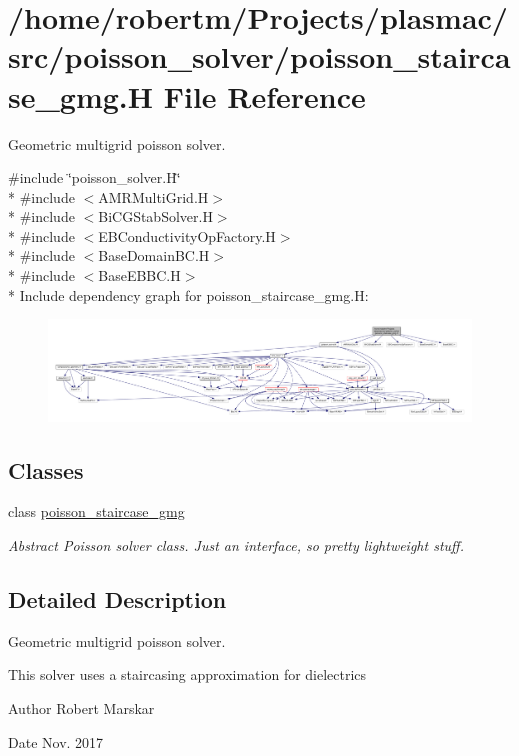 \hypertarget{poisson__staircase__gmg_8H}{}\section{/home/robertm/\+Projects/plasmac/src/poisson\+\_\+solver/poisson\+\_\+staircase\+\_\+gmg.H File Reference}
\label{poisson__staircase__gmg_8H}


Geometric multigrid poisson solver.  


{\ttfamily \#include \char`\"{}poisson\+\_\+solver.\+H\char`\"{}}\\*
{\ttfamily \#include $<$A\+M\+R\+Multi\+Grid.\+H$>$}\\*
{\ttfamily \#include $<$Bi\+C\+G\+Stab\+Solver.\+H$>$}\\*
{\ttfamily \#include $<$E\+B\+Conductivity\+Op\+Factory.\+H$>$}\\*
{\ttfamily \#include $<$Base\+Domain\+B\+C.\+H$>$}\\*
{\ttfamily \#include $<$Base\+E\+B\+B\+C.\+H$>$}\\*
Include dependency graph for poisson\+\_\+staircase\+\_\+gmg.\+H\+:\nopagebreak
\begin{figure}[H]
\begin{center}
\leavevmode
\includegraphics[width=350pt]{poisson__staircase__gmg_8H__incl}
\end{center}
\end{figure}
\subsection*{Classes}
\begin{DoxyCompactItemize}
\item 
class \hyperlink{classpoisson__staircase__gmg}{poisson\+\_\+staircase\+\_\+gmg}
\begin{DoxyCompactList}\small\item\em Abstract Poisson solver class. Just an interface, so pretty lightweight stuff. \end{DoxyCompactList}\end{DoxyCompactItemize}


\subsection{Detailed Description}
Geometric multigrid poisson solver. 

This solver uses a staircasing approximation for dielectrics \begin{DoxyAuthor}{Author}
Robert Marskar 
\end{DoxyAuthor}
\begin{DoxyDate}{Date}
Nov. 2017 
\end{DoxyDate}
